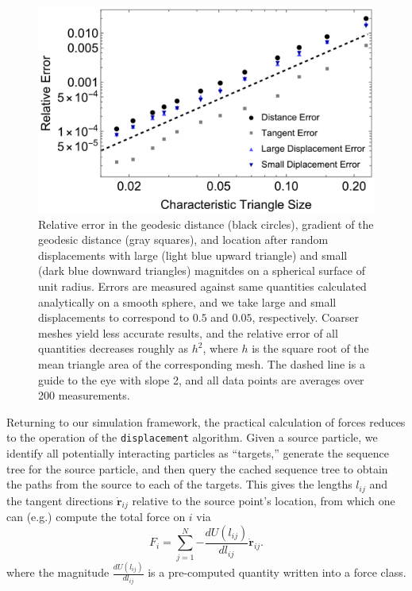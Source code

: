 \documentclass[preprint,12pt]{elsarticle}
\newcommand{\bs}[1]{\boldsymbol{#1}}
\newcounter{bla}
\begin{document}
\begin{figure}
    \centering
    \includegraphics[width=1.0\columnwidth]{error_v_trisize.pdf}
    \caption{Relative error in the geodesic distance (black circles), gradient of the geodesic distance (gray squares), and location after random displacements with large (light blue upward triangle) and small (dark blue downward triangles) magnitdes on a spherical surface of unit radius. Errors are measured against same quantities calculated analytically on a smooth sphere, and we take large and small displacements to correspond to $0.5$ and $0.05$, respectively. Coarser meshes yield less accurate results, and the relative error of all quantities decreases roughly as $h^2$, where $h$ is the square root of the mean triangle area of the corresponding mesh. The dashed line is a guide to the eye with slope 2, and all data points are averages over 200 measurements. }
    \label{fig:error_v_trisize}
\end{figure}


Returning to our simulation framework, the practical calculation of forces reduces to the operation of the \verb+displacement+ algorithm. Given a source particle, we identify all potentially interacting particles as ``targets,'' generate the sequence tree for the source particle, and then query the cached sequence tree to obtain the paths from the source to each of the targets. This gives the lengths $l_{ij}$ and the tangent directions $\dot{\bs{r}}_{ij}$ relative to the source point's location, from which one can (e.g.) compute the total force on $i$ via
\begin{equation}
    F_i = \sum_{j=1}^N{-\frac{dU\left(l_{ij}\right)}{d l_{ij}} \dot{\bs{r}}_{ij}}.
\end{equation}
where the magnitude $\frac{dU\left(l_{ij}\right)}{d l_{ij}}$ is a pre-computed quantity written into a force class. 
\end{document}
